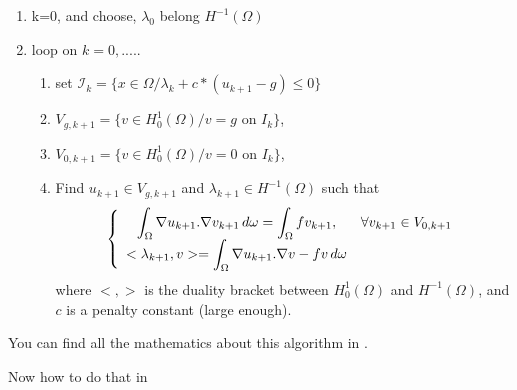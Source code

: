 \documentclass[a4paper,twoside,12pt]{book}
\begin{document}
\begin{enumerate}
\item k=0, and choose, $\lambda_0$ belong $ H^{-1}(\Omega)$
\item loop on $ k = 0, .....$
 \begin{enumerate}
\item  set $ \mathcal{I}_{k} = \{ x \in \Omega / \lambda_{k} + c * ( u_{k+1} - g)  \leq 0 \} $
\item  $ V_{g,k+1} = \{ v\in H^1_0(\Omega) / v = g $   on ${I}_{k} \}$,
\item  $ V_{0,k+1} = \{ v\in  H^1_0(\Omega) / v = 0$ on ${I}_{k} \}$,
 \item Find  $ u_{k+1} \in V_{g,k+1} $ and  $\lambda_{k+1} \in H^{-1}(\Omega)$ such that
 $$
 \left\{\begin{array}{cc}
 \displaystyle  \int_\Omega \nabla u_{k+1}. \nabla v_{k+1}   \,d\omega = \int_\Omega f v_{k+1}  , &\forall v_{k+1} \in  V_{0,k+1} \cr
 \displaystyle  <\lambda_{k+1},v>  =  \int_\Omega \nabla u_{k+1}. \nabla v  -  f v \,d\omega &
  \end{array}\right.
 $$
 where $<,>$ is the duality bracket between $ H^{1}_0(\Omega)$ and  $ H^{-1}(\Omega)$, and $c$
is  a penalty constant (large enough).
\end{enumerate}

\end{enumerate}
You can find all the mathematics  about this algorithm in \cite{ItoKunisch}.

Now how to do that in \freefempp
\end{document}
